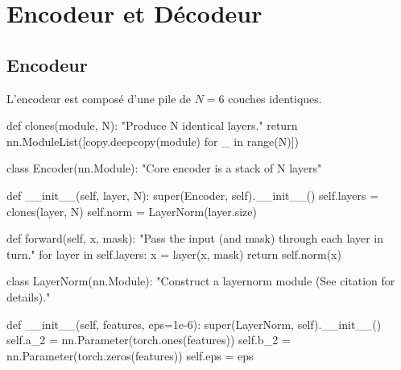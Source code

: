 \documentclass[
  letterpaper,
  DIV=11,
  numbers=noendperiod]{scrreprt}
\newenvironment{Shaded}{\begin{snugshade}}{\end{snugshade}}
\newcommand{\BuiltInTok}[1]{\textcolor[rgb]{0.00,0.23,0.31}{#1}}
\newcommand{\CommentTok}[1]{\textcolor[rgb]{0.37,0.37,0.37}{#1}}
\newcommand{\ControlFlowTok}[1]{\textcolor[rgb]{0.00,0.23,0.31}{#1}}
\newcommand{\FloatTok}[1]{\textcolor[rgb]{0.68,0.00,0.00}{#1}}
\newcommand{\FunctionTok}[1]{\textcolor[rgb]{0.28,0.35,0.67}{#1}}
\newcommand{\KeywordTok}[1]{\textcolor[rgb]{0.00,0.23,0.31}{#1}}
\newcommand{\NormalTok}[1]{\textcolor[rgb]{0.00,0.23,0.31}{#1}}
\newcommand{\OperatorTok}[1]{\textcolor[rgb]{0.37,0.37,0.37}{#1}}
\newcommand{\VariableTok}[1]{\textcolor[rgb]{0.07,0.07,0.07}{#1}}
\begin{document}
\section{Encodeur et Décodeur}\label{encodeur-et-duxe9codeur}

\subsection{Encodeur}\label{encodeur}

L'encodeur est composé d'une pile de \(N=6\) couches identiques.

\begin{Shaded}
\begin{Highlighting}[]
\KeywordTok{def}\NormalTok{ clones(module, N):}
    \CommentTok{"Produce N identical layers."}
    \ControlFlowTok{return}\NormalTok{ nn.ModuleList([copy.deepcopy(module) }\ControlFlowTok{for}\NormalTok{ \_ }\KeywordTok{in} \BuiltInTok{range}\NormalTok{(N)])}
    

\KeywordTok{class}\NormalTok{ Encoder(nn.Module):}
    \CommentTok{"Core encoder is a stack of N layers"}

    \KeywordTok{def} \FunctionTok{\_\_init\_\_}\NormalTok{(}\VariableTok{self}\NormalTok{, layer, N):}
        \BuiltInTok{super}\NormalTok{(Encoder, }\VariableTok{self}\NormalTok{).}\FunctionTok{\_\_init\_\_}\NormalTok{()}
        \VariableTok{self}\NormalTok{.layers }\OperatorTok{=}\NormalTok{ clones(layer, N)}
        \VariableTok{self}\NormalTok{.norm }\OperatorTok{=}\NormalTok{ LayerNorm(layer.size)}

    \KeywordTok{def}\NormalTok{ forward(}\VariableTok{self}\NormalTok{, x, mask):}
        \CommentTok{"Pass the input (and mask) through each layer in turn."}
        \ControlFlowTok{for}\NormalTok{ layer }\KeywordTok{in} \VariableTok{self}\NormalTok{.layers:}
\NormalTok{            x }\OperatorTok{=}\NormalTok{ layer(x, mask)}
        \ControlFlowTok{return} \VariableTok{self}\NormalTok{.norm(x)}
        
\KeywordTok{class}\NormalTok{ LayerNorm(nn.Module):}
    \CommentTok{"Construct a layernorm module (See citation for details)."}

    \KeywordTok{def} \FunctionTok{\_\_init\_\_}\NormalTok{(}\VariableTok{self}\NormalTok{, features, eps}\OperatorTok{=}\FloatTok{1e{-}6}\NormalTok{):}
        \BuiltInTok{super}\NormalTok{(LayerNorm, }\VariableTok{self}\NormalTok{).}\FunctionTok{\_\_init\_\_}\NormalTok{()}
        \VariableTok{self}\NormalTok{.a\_2 }\OperatorTok{=}\NormalTok{ nn.Parameter(torch.ones(features))}
        \VariableTok{self}\NormalTok{.b\_2 }\OperatorTok{=}\NormalTok{ nn.Parameter(torch.zeros(features))}
        \VariableTok{self}\NormalTok{.eps }\OperatorTok{=}\NormalTok{ eps}


\end{Highlighting}
\end{Shaded}
\end{document}
